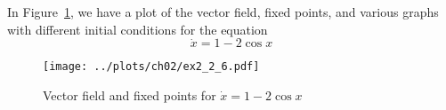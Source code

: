 
In Figure~\ref{fig2_2_6vecfield}, we have a plot of the vector field, fixed points,
and various graphs with different initial conditions for the equation 
\[
    \dot{x} = 1 - 2\cos{x} 
\]
\begin{figure}[!ht]
    \texttt{[image: ../plots/ch02/ex2\_2\_6.pdf]}
    \caption{Vector field and fixed points for $\dot{x} = 1 - 2\cos{x}$
        \label{fig2_2_6vecfield}}
\end{figure}
